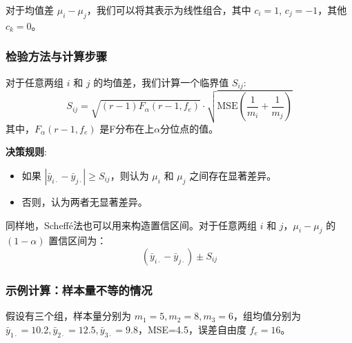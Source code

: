 \documentclass[12pt, a4paper]{amsart}
\begin{document}
对于均值差 $\mu_i - \mu_j$，我们可以将其表示为线性组合，其中 $c_i = 1$, $c_j = -1$，其他 $c_k = 0$。

\subsubsection{检验方法与计算步骤}
对于任意两组 $i$ 和 $j$ 的均值差，我们计算一个临界值 $S_{ij}$:
\begin{equation}
S_{ij} = \sqrt{(r-1)F_{\alpha}(r-1, f_e)} \cdot \sqrt{\text{MSE}(\frac{1}{m_i} + \frac{1}{m_j})}
\label{eq:scheffe}
\end{equation}
其中，$F_{\alpha}(r-1, f_e)$ 是F分布在上$\alpha$分位点的值。

\textbf{决策规则}:
\begin{itemize}
    \item 如果 $|\bar{y}_{i\cdot} - \bar{y}_{j\cdot}| \geq S_{ij}$，则认为 $\mu_i$ 和 $\mu_j$ 之间存在显著差异。
    \item 否则，认为两者无显著差异。
\end{itemize}

同样地，Scheffé法也可以用来构造置信区间。对于任意两组 $i$ 和 $j$，$\mu_i - \mu_j$ 的 $(1-\alpha)$ 置信区间为：
\begin{equation}
(\bar{y}_{i\cdot} - \bar{y}_{j\cdot}) \pm S_{ij}
\end{equation}

\subsubsection{示例计算：样本量不等的情况}
假设有三个组，样本量分别为 $m_1=5, m_2=8, m_3=6$，组均值分别为 $\bar{y}_{1\cdot}=10.2, \bar{y}_{2\cdot}=12.5, \bar{y}_{3\cdot}=9.8$，MSE=4.5，误差自由度 $f_e=16$。
\end{document}
